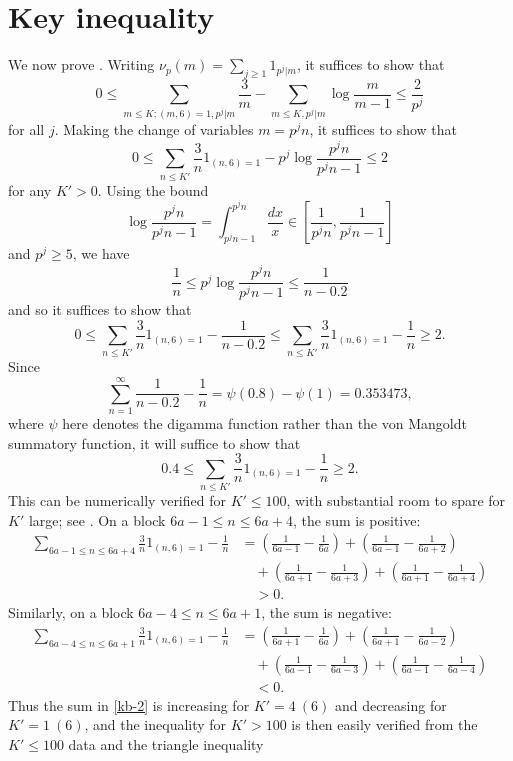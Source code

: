 \documentclass[12pt,a4paper,reqno]{amsart}
\numberwithin{equation}{section}
\theoremstyle{plain}
\theoremstyle{definition}
\begin{document}
\section{Key inequality}\label{key-app}

We now prove . Writing $\nu_p(m) = \sum_{j \geq 1} 1_{p^j|m}$, it suffices to show that
  $$ 0 \leq \sum_{m \leq K; (m,6)=1, p^j|m} \frac{3}{m}
  - \sum_{m \leq K, p^j|m} \log \frac{m}{m-1} \leq \frac{2}{p^j}$$
  for all $j$.  Making the change of variables $m = p^j n$, it suffices to show that
  $$ 0 \leq \sum_{n \leq K'} \frac{3}{n} 1_{(n,6)=1} - p^j \log \frac{p^j n}{p^j n - 1} \leq 2$$
  for any $K' > 0$.   Using the bound
  $$ \log \frac{p^jn}{p^jn - 1} = \int_{p^jn-1}^{p^jn} \frac{dx}{x} \in [\frac{1}{p^j n}, \frac{1}{p^jn-1}]$$
  and $p^j \geq 5$, we have
  $$ \frac{1}{n} \leq p^j \log \frac{p^j n}{p^j n - 1} \leq \frac{1}{n-0.2}$$
  and so it suffices to show that
  \begin{equation}\label{kb}
  0 \leq \sum_{n \leq K'} \frac{3}{n} 1_{(n,6)=1} - \frac{1}{n-0.2} 
  \leq
  \sum_{n \leq K'} \frac{3}{n} 1_{(n,6)=1} - \frac{1}{n} \geq 2.
  \end{equation}
  Since 
  $$ \sum_{n=1}^\infty \frac{1}{n-0.2}-\frac{1}{n} = \psi(0.8)-\psi(1) = 0.353473,$$
  where $\psi$ here denotes the digamma function rather than the von Mangoldt summatory function, it will suffice to show that
  \begin{equation}\label{kb-2} 0.4 \leq
  \sum_{n \leq K'} \frac{3}{n} 1_{(n,6)=1} - \frac{1}{n} \geq 2.\end{equation}
  This can be numerically verified for $K' \leq 100$, with substantial room to spare for $K'$ large; see . On a block $6a-1 \leq n \leq 6a+4$, the sum is positive:
  \begin{align*}
  \sum_{6a-1 \leq n \leq 6a+4} \frac{3}{n} 1_{(n,6)=1} - \frac{1}{n } &= \left(\frac{1}{6a-1} - \frac{1}{6a}\right) + \left(\frac{1}{6a-1} - \frac{1}{6a+2}\right)\\
  &\quad + \left(\frac{1}{6a+1} - \frac{1}{6a+3}\right) + \left(\frac{1}{6a+1} - \frac{1}{6a+4}\right) \\
  &\quad > 0.
  \end{align*}
  Similarly, on a block $6a-4 \leq n \leq 6a+1$, the sum is negative:
  \begin{align*}
    \sum_{6a-4 \leq n \leq 6a+1} \frac{3}{n} 1_{(n,6)=1} - \frac{1}{n } &= \left(\frac{1}{6a+1} - \frac{1}{6a}\right)
    + \left(\frac{1}{6a+1} - \frac{1}{6a-2}\right)\\
    &\quad  + \left(\frac{1}{6a-1} - \frac{1}{6a-3}\right)
    + \left(\frac{1}{6a-1} - \frac{1}{6a-4}\right)\\
    &\quad  < 0.
  \end{align*}
  Thus the sum in \eqref{kb-2} is increasing for $K' = 4\ (6)$ and decreasing for $K' = 1\ (6)$, and the inequality for $K'>100$ is then easily verified from the $K' \leq 100$ data and the triangle inequality
  
\end{document}
